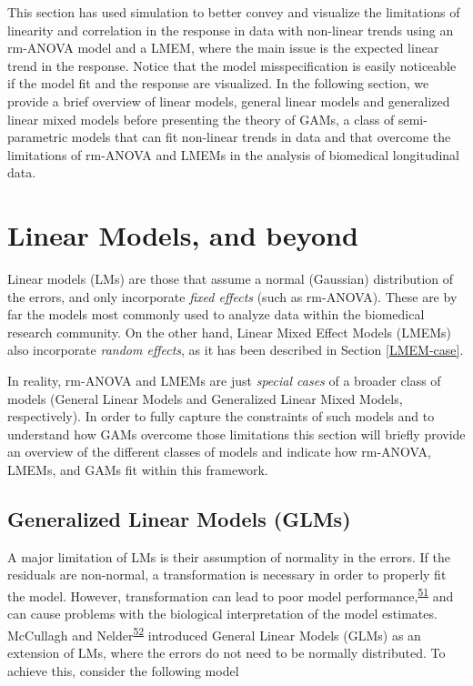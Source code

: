 \documentclass[
]{article}
\begin{document}
This section has used simulation to better convey and visualize the limitations of linearity and correlation in the response in data with non-linear trends using an rm-ANOVA model and a LMEM, where the main issue is the expected linear trend in the response. Notice that the model misspecification is easily noticeable if the model fit and the response are visualized. In the following section, we provide a brief overview of linear models, general linear models and generalized linear mixed models before presenting the theory of GAMs, a class of semi-parametric models that can fit non-linear trends in data and that overcome the limitations of rm-ANOVA and LMEMs in the analysis of biomedical longitudinal data.

\hypertarget{linear-models-and-beyond}{%
\section{Linear Models, and beyond}\label{linear-models-and-beyond}}

Linear models (LMs) are those that assume a normal (Gaussian) distribution of the errors, and only incorporate \emph{fixed effects} (such as rm-ANOVA). These are by far the models most commonly used to analyze data within the biomedical research community. On the other hand, Linear Mixed Effect Models (LMEMs) also incorporate \emph{random effects}, as it has been described in Section \ref{LMEM-case}.

In reality, rm-ANOVA and LMEMs are just \emph{special cases} of a broader class of models (General Linear Models and Generalized Linear Mixed Models, respectively). In order to fully capture the constraints of such models and to understand how GAMs overcome those limitations this section will briefly provide an overview of the different classes of models and indicate how rm-ANOVA, LMEMs, and GAMs fit within this framework.

\hypertarget{generalized-linear-models-glms}{%
\subsection{Generalized Linear Models (GLMs)}\label{generalized-linear-models-glms}}

A major limitation of LMs is their assumption of normality in the errors. If the residuals are non-normal, a transformation is necessary in order to properly fit the model. However, transformation can lead to poor model performance,\textsuperscript{\protect\hyperlink{ref-ohara2010}{51}} and can cause problems with the biological interpretation of the model estimates. McCullagh and Nelder\textsuperscript{\protect\hyperlink{ref-nelder1972}{52}} introduced General Linear Models (GLMs) as an extension of LMs, where the errors do not need to be normally distributed. To achieve this, consider the following model
\end{document}
